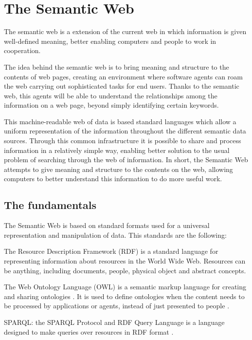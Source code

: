 \section{The Semantic Web}

The semantic web is a extension of the current web in which information is given well-defined meaning, better enabling computers and people to work in cooperation. \cite{berners2001semantic}

The idea behind the semantic web is to bring meaning and structure to the contents of web pages, creating an environment where software agents can roam the web carrying out sophisticated tasks for end users. Thanks to the semantic web, this agents will be able to understand the relationships among the information on a web page, beyond simply identifying certain keywords. 

This machine-readable web of data is based standard languages which allow a uniform representation of the information throughout the different semantic data sources. Through this common infrastructure it is possible to share and process information in a relatively simple way, enabling better solution to the usual problem of searching through the web of information. In short, the Semantic Web attempts to give meaning and structure to the contents on the web, allowing computers to better understand this information to do more useful work.

\subsection*{The fundamentals}

The Semantic Web is based on standard formats used for a universal representation and manipulation of data. This standards are the following:

\begin{description}
	\item[RDF:] The Resource Description Framework (RDF) is a standard language for representing information about resources in the World Wide Web. Resources can be anything, including documents, people, physical object and abstract concepts. \cite{rdfprimer10}
	
	\item[OWL:] The Web Ontology Language (OWL) is a semantic markup language for creating and sharing ontologies \cite{bechhofer2009owl}.  It is used to define ontologies when the content needs to be processed by applications or agents, instead of just presented to people \cite{mcguinness2004owl}. 

	\item{SPARQL:} the SPARQL Protocol and RDF Query Language is a language designed to make queries over resources in RDF format \cite{sparqlquery}. 
\end{description}

